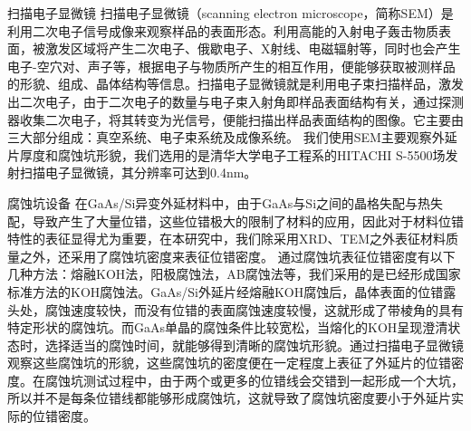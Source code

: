 {\hei 扫描电子显微镜}
扫描电子显微镜（scanning electron microscope，简称SEM）是利用二次电子信号成像来观察样品的表面形态。利用高能的入射电子轰击物质表面，被激发区域将产生二次电子、俄歇电子、X射线、电磁辐射等，同时也会产生电子-空穴对、声子等，根据电子与物质所产生的相互作用，便能够获取被测样品的形貌、组成、晶体结构等信息。扫描电子显微镜就是利用电子束扫描样品，激发出二次电子，由于二次电子的数量与电子束入射角即样品表面结构有关，通过探测器收集二次电子，将其转变为光信号，便能扫描出样品表面结构的图像。它主要由三大部分组成：真空系统、电子束系统及成像系统。
我们使用SEM主要观察外延片厚度和腐蚀坑形貌，我们选用的是清华大学电子工程系的HITACHI S-5500场发射扫描电子显微镜，其分辨率可达到0.4nm。

{\hei 腐蚀坑设备}
在GaAs/Si异变外延材料中，由于GaAs与Si之间的晶格失配与热失配，导致产生了大量位错，这些位错极大的限制了材料的应用，因此对于材料位错特性的表征显得尤为重要，在本研究中，我们除采用XRD、TEM之外表征材料质量之外，还采用了腐蚀坑密度来表征位错密度。
通过腐蚀坑表征位错密度有以下几种方法：熔融KOH法\cite{Grabmaier1969}，阳极腐蚀法\cite{Cao1980}，AB腐蚀法\cite{Abrahams1965}等，我们采用的是已经形成国家标准方法的KOH腐蚀法。GaAs/Si外延片经熔融KOH腐蚀后，晶体表面的位错露头处，腐蚀速度较快，而没有位错的表面腐蚀速度较慢，这就形成了带棱角的具有特定形状的腐蚀坑。而GaAs单晶的腐蚀条件比较宽松，当熔化的KOH呈现澄清状态时，选择适当的腐蚀时间，就能够得到清晰的腐蚀坑形貌。通过扫描电子显微镜观察这些腐蚀坑的形貌，这些腐蚀坑的密度便在一定程度上表征了外延片的位错密度。在腐蚀坑测试过程中，由于两个或更多的位错线会交错到一起形成一个大坑，所以并不是每条位错线都能够形成腐蚀坑，这就导致了腐蚀坑密度要小于外延片实际的位错密度\cite{}。


\ifx\usechapbib\empty


\fi


